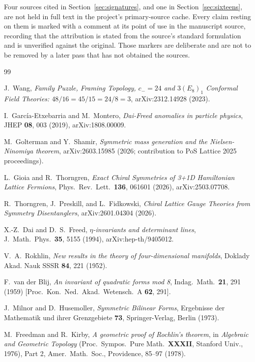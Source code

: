 \documentclass[aps,prd,reprint,nofootinbib,superscriptaddress]{revtex4-2}
\makeatletter
\DeclareRobustCommand{\texttt}[1]{%
  \skeft@origtexttt{\let\skeftunder\_\def\_{\skeftunder\allowbreak}#1}}
\makeatother
\begin{document}
Four sources cited in Section~\ref{sec:signatures}, and one in
Section~\ref{sec:sixteens}, are not held in full text in the project's
primary-source cache. Every claim resting on them is marked with a
\texttt{\% TODO} comment at its point of use in the manuscript source,
recording that the attribution is stated from the source's standard
formulation and is unverified against the original. Those markers are
deliberate and are not to be removed by a later pass that has not
obtained the sources.

\begin{thebibliography}{99}

J.~Wang,
\emph{Family Puzzle, Framing Topology, $c_- = 24$ and $3(E_8)_1$
Conformal Field Theories: $48/16 = 45/15 = 24/8 = 3$},
arXiv:2312.14928 (2023).

I.~Garc\'ia-Etxebarria and M.~Montero,
\emph{Dai-Freed anomalies in particle physics},
JHEP \textbf{08}, 003 (2019), arXiv:1808.00009.

M.~Golterman and Y.~Shamir,
\emph{Symmetric mass generation and the Nielsen-Ninomiya theorem},
arXiv:2603.15985 (2026; contribution to PoS Lattice 2025 proceedings).

L.~Gioia and R.~Thorngren,
\emph{Exact Chiral Symmetries of 3+1D Hamiltonian Lattice Fermions},
Phys.~Rev.~Lett.~\textbf{136}, 061601 (2026), arXiv:2503.07708.

R.~Thorngren, J.~Preskill, and L.~Fidkowski,
\emph{Chiral Lattice Gauge Theories from Symmetry Disentanglers},
arXiv:2601.04304 (2026).

X.-Z.~Dai and D.~S.~Freed,
\emph{$\eta$-invariants and determinant lines},
J.~Math.~Phys.~\textbf{35}, 5155 (1994),
arXiv:hep-th/9405012.

V.~A.~Rokhlin,
\emph{New results in the theory of four-dimensional manifolds},
Doklady Akad. Nauk SSSR \textbf{84}, 221 (1952).

F.~van der Blij,
\emph{An invariant of quadratic forms mod 8},
Indag.\ Math.\ \textbf{21}, 291 (1959)
[Proc.\ Kon.\ Ned.\ Akad.\ Wetensch.\ A \textbf{62}, 291].

J.~Milnor and D.~Husemoller,
\emph{Symmetric Bilinear Forms},
Ergebnisse der Mathematik und ihrer Grenzgebiete \textbf{73},
Springer-Verlag, Berlin (1973).

M.~Freedman and R.~Kirby,
\emph{A geometric proof of Rochlin's theorem},
in \emph{Algebraic and Geometric Topology}
(Proc.\ Sympos.\ Pure Math.\ \textbf{XXXII}, Stanford Univ., 1976),
Part 2, Amer.\ Math.\ Soc., Providence, 85--97 (1978).


\end{thebibliography}
\end{document}
